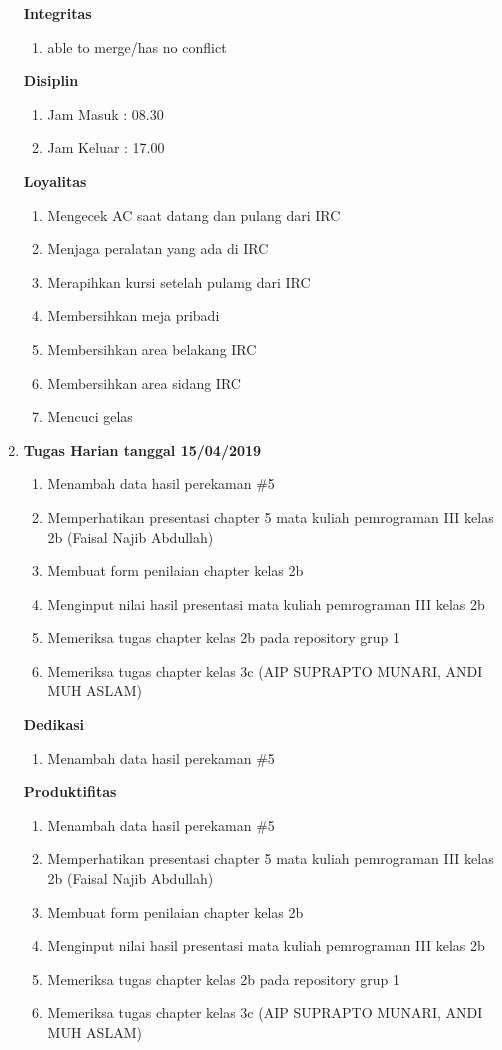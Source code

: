 \begin{enumerate}
\textbf{Integritas}
\begin{enumerate}
\item able to merge/has no conflict
\end{enumerate}

\textbf{Disiplin}
\begin{enumerate}
\item Jam Masuk : 08.30
\item Jam Keluar : 17.00
\end{enumerate}

\textbf{Loyalitas}
\begin{enumerate}
\item Mengecek AC saat datang dan pulang dari IRC
\item Menjaga peralatan yang ada di IRC
\item Merapihkan kursi setelah pulamg dari IRC
\item Membersihkan meja pribadi
\item Membersihkan area belakang IRC
\item Membersihkan area sidang IRC
\item Mencuci gelas
\end{enumerate}


\item \textbf{Tugas Harian tanggal 15/04/2019}
\begin{enumerate}
\item Menambah data hasil perekaman \#5
\item Memperhatikan presentasi chapter 5 mata kuliah pemrograman III kelas 2b (Faisal Najib Abdullah)
\item Membuat form penilaian chapter kelas 2b
\item Menginput nilai hasil presentasi mata kuliah pemrograman III kelas 2b
\item Memeriksa tugas chapter kelas 2b pada repository grup 1
\item Memeriksa tugas chapter kelas 3c  (AIP SUPRAPTO MUNARI, ANDI MUH ASLAM)
\end{enumerate}

\textbf{Dedikasi}
\begin{enumerate}
\item Menambah data hasil perekaman \#5
\end{enumerate}

\textbf{Produktifitas}
\begin{enumerate}
\item Menambah data hasil perekaman \#5
\item Memperhatikan presentasi chapter 5 mata kuliah pemrograman III kelas 2b (Faisal Najib Abdullah)
\item Membuat form penilaian chapter kelas 2b
\item Menginput nilai hasil presentasi mata kuliah pemrograman III kelas 2b
\item Memeriksa tugas chapter kelas 2b pada repository grup 1
\item Memeriksa tugas chapter kelas 3c  (AIP SUPRAPTO MUNARI, ANDI MUH ASLAM)
\end{enumerate}


\end{enumerate}
